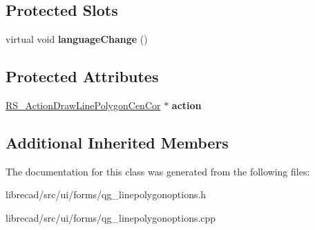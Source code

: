 \subsection*{Protected Slots}
\begin{DoxyCompactItemize}
\item 
\hypertarget{classQG__LinePolygonOptions_a7bce64f47798ac509f6280e398a8628f}{virtual void {\bfseries language\-Change} ()}\label{classQG__LinePolygonOptions_a7bce64f47798ac509f6280e398a8628f}

\end{DoxyCompactItemize}
\subsection*{Protected Attributes}
\begin{DoxyCompactItemize}
\item 
\hypertarget{classQG__LinePolygonOptions_a426462cdbf5c97da4dc0d92b3a6e6386}{\hyperlink{classRS__ActionDrawLinePolygonCenCor}{R\-S\-\_\-\-Action\-Draw\-Line\-Polygon\-Cen\-Cor} $\ast$ {\bfseries action}}\label{classQG__LinePolygonOptions_a426462cdbf5c97da4dc0d92b3a6e6386}

\end{DoxyCompactItemize}
\subsection*{Additional Inherited Members}


The documentation for this class was generated from the following files\-:\begin{DoxyCompactItemize}
\item 
librecad/src/ui/forms/qg\-\_\-linepolygonoptions.\-h\item 
librecad/src/ui/forms/qg\-\_\-linepolygonoptions.\-cpp\end{DoxyCompactItemize}
